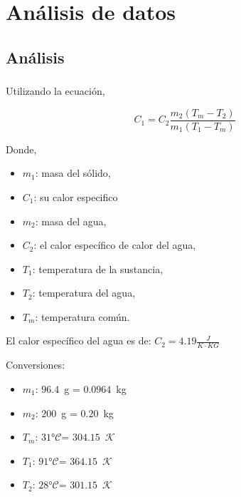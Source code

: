 \documentclass[letterpaper, 12pt]{article}
\newcommand{\Celsius}[0]{°$\mathcal{C}$}
\newcommand{\Kelvin}[0]{$\mathcal{K}$}
\begin{document}
\section{Análisis de datos}

\subsection{Análisis}

\subsubsection{}

Utilizando la ecuación,

\begin{equation}
      C_{1} = C_{2} \frac{m_{2} (T_{m} - T_{2})}{m_1 (T_{1} - T_{m})}
      \label{eq:calor_especifico_1}
\end{equation}

Donde,

\begin{itemize}[label=$\triangleright$]
      \item $m_{1}$: masa del sólido,
      \item $C_{1}$: su calor especifico
      \item $m_{2}$: masa del agua,
      \item $C_{2}$: el calor específico de calor del agua,
      \item $T_{1}$: temperatura de la sustancia,
      \item $T_{2}$: temperatura del agua,
      \item $T_{m}$: temperatura común.
\end{itemize}

El calor específico del agua es de: \hfill{} \break{}
$C_{2} = 4.19\frac{J}{K\cdot KG}$

\smallskip

Conversiones:

\begin{itemize}[label=$\triangleright$]
      \item $m_{1}$: $96.4$~g = $0.0964$~kg
      \item $m_{2}$: $200$~g = $0.20$~kg
      \item $T_{m}$: $31$\Celsius = $304.15$~\Kelvin
      \item $T_{1}$: $91$\Celsius = $364.15$~\Kelvin
      \item $T_{2}$: $28$\Celsius = $301.15$~\Kelvin
\end{itemize}
\end{document}
